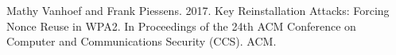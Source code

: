 \documentclass[12pt]{article}
\begin{document}
%
%
%
%
\begin{thebibliography}{}
 Mathy Vanhoef and Frank Piessens. 2017. Key Reinstallation Attacks: Forcing Nonce Reuse in WPA2. In Proceedings of the 24th ACM Conference on Computer and Communications Security (CCS). ACM.
\end{thebibliography}
%
%
%


\end{document}
